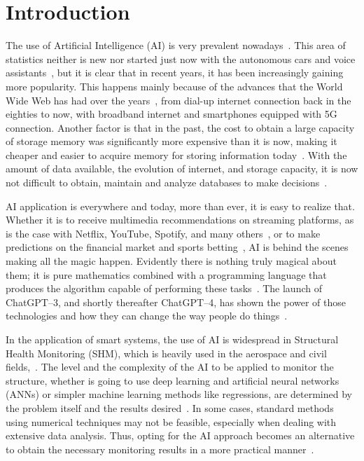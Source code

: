 \chapter{Introduction}

The use of Artificial Intelligence (AI) is very prevalent nowadays~\cite{lee2020,poola2017,rabunal2006}. 
This area of statistics neither is new nor started just now with the autonomous cars and voice assistants~\cite{muthukrishnan2020}, but it is clear that in recent years, it has been increasingly gaining more popularity. 
This happens mainly because of the advances that the World Wide Web has had over the years~\cite{leiner2009,cohen-almagor2011}, from dial-up internet connection back in the eighties to now, with broadband internet and smartphones equipped with 5G connection. 
Another factor is that in the past, the cost to obtain a large capacity of storage memory was significantly more expensive than it is now, making it cheaper and easier to acquire memory for storing information today~\cite{goda2012}. 
With the amount of data available, the evolution of internet, and storage capacity, it is now not difficult to obtain, maintain and analyze databases to make decisions~\cite{duan2019}.

AI application is everywhere and today, more than ever, it is easy to realize that. 
Whether it is to receive multimedia recommendations on streaming platforms, as is the case with Netflix, YouTube, Spotify, and many others~\cite{chan-olmsted2019}, or to make predictions on the financial market and sports betting~\cite{milana2021,kollar2021,hubacek2019}, AI is behind the scenes making all the magic happen. 
Evidently there is nothing truly magical about them; it is pure mathematics combined with a programming language that produces the algorithm capable of performing these tasks~\cite{goodfellow2016,aurelien2022,raschka2015,raschka2022}.
The launch of ChatGPT--3, and shortly thereafter ChatGPT--4, has shown the power of those technologies and how they can change the way people do things~\cite{biswas2023,biswas2023a, lund2023,baidoo-anu2023}.

In the application of smart systems, the use of AI is widespread in Structural Health Monitoring (SHM), which is heavily used in the aerospace and civil fields,~\cite{azimi2020,ye2019}. 
The level and the complexity of the AI to be applied to monitor the structure, whether is going to use deep learning and artificial neural networks (ANNs) or simpler machine learning methods like regressions, are determined by the problem itself and the results desired~\cite{farrar2012}. 
In some cases, standard methods using numerical techniques may not be feasible, especially when dealing with extensive data analysis. 
Thus, opting for the AI approach becomes an alternative to obtain the necessary monitoring results in a more practical manner~\cite{smarsly2007,sun2020}. 

